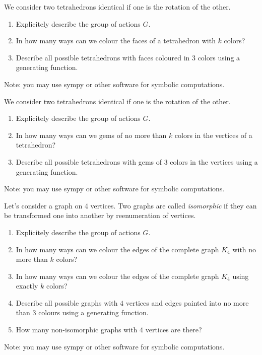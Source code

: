\documentclass[12pt]{article}
\begin{document}
\begin{exercise}
    We consider two tetrahedrons identical if one is the rotation of the other. 

    \begin{enumerate}[label=\alph*)]
        \item Explicitely describe the group of actions $G$. 
        \item In how many ways can we colour the faces of a tetrahedron with $k$ colors?
        \item Describe all possible tetrahedrons with faces coloured in $3$ colors using a generating function.
    \end{enumerate}
    Note: you may use sympy or other software for symbolic computations.
\end{exercise}


\begin{exercise}
    We consider two tetrahedrons identical if one is the rotation of the other. 

    \begin{enumerate}[label=\alph*)]
        \item Explicitely describe the group of actions $G$. 
        \item In how many ways can we gems of no more than $k$ colors in the vertices of a tetrahedron?
        \item Describe all possible tetrahedrons with gems of $3$ colors in the vertices using a generating function.
    \end{enumerate}
    Note: you may use sympy or other software for symbolic computations.
\end{exercise}


\begin{exercise}
    Let's consider a graph on $4$ vertices.
        Two graphs are called \emph{isomorphic} if they can be transformed one into another by reenumeration of vertices.
    
        \begin{enumerate}[label=\alph*)]
        \item Explicitely describe the group of actions $G$. 
        \item In how many ways can we colour the edges of the complete graph $K_4$ with no more than $k$ colors?
        \item In how many ways can we colour the edges of the complete graph $K_4$ using exactly $k$ colors?
        \item Describe all possible graphs with $4$ vertices and edges painted into no more than $3$ colours using a generating function.
        \item How many non-isomorphic graphs with $4$ vertices are there?
    \end{enumerate}
    Note: you may use sympy or other software for symbolic computations.
\end{exercise}
\end{document}
